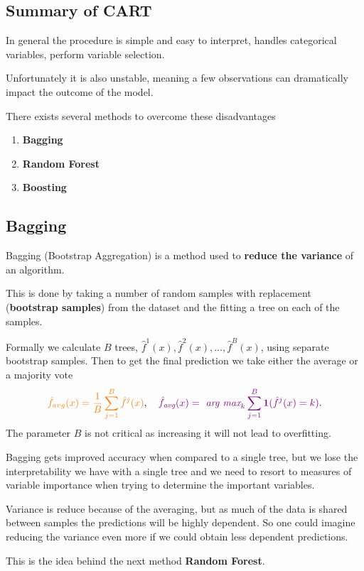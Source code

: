 \documentclass[aspectratio=169,10pt]{beamer}
\begin{document}
\subsection{Summary of CART}
\begin{frame}{\secname}{\subsecname}
  In general the procedure is simple and easy to interpret, handles categorical variables, perform variable selection.

  Unfortunately it is also unstable, meaning a few observations can dramatically impact the outcome of the model.

  There exists several methods to overcome these disadvantages
  \begin{enumerate}
    \item \textbf{Bagging}
    \item \textbf{Random Forest}
    \item \textbf{Boosting}
  \end{enumerate}
\end{frame}

\subsection{Bagging}
\begin{frame}{\secname}{\subsecname}
  Bagging (Bootstrap Aggregation) is a method used to \textbf{reduce the variance} of an algorithm.

  This is done by taking a number of random samples with replacement (\textbf{bootstrap samples}) from the dataset and the fitting a tree on each of the samples.

  Formally we calculate $B$ trees, $\hat{f}^1(x), \hat{f}^2(x), \ldots, \hat{f}^B(x)$, using separate bootstrap samples. 
  Then to get the final prediction we take either the {\color{orange}average} or a {\color{violet}majority vote}
  \begin{align}
    {\color{orange}\hat{f}_{avg}(x) = \frac{1}{B} \sum_{j=1}^B \hat{f}^j(x)}, \quad
    {\color{violet}\hat{f}_{\textit{avg}}(x) = \textit{ arg max}_k \sum_{j=1}^B \mathbf{1}(\hat{f}^j(x) = k)}. 
  \end{align}
  The parameter $B$ is not critical as increasing it will not lead to overfitting.
\end{frame}

\begin{frame}{\secname}{\subsecname}
  Bagging gets improved accuracy when compared to a single tree, but we lose the interpretability we have with a single tree and we need to resort to measures of variable importance when trying to determine the important variables.

  Variance is reduce because of the averaging, but as much of the data is shared between samples the predictions will be highly dependent.
  So one could imagine reducing the variance even more if we could obtain less dependent predictions.

  This is the idea behind the next method \textbf{Random Forest}.
\end{frame}
\end{document}
